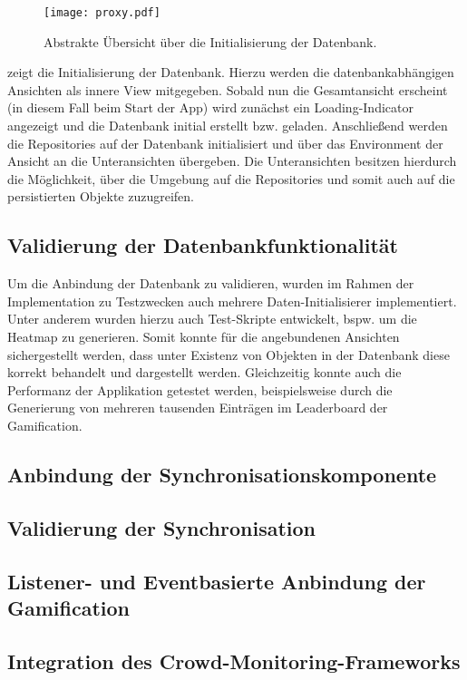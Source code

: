 \begin{figure}[H]
\texttt{[image: proxy.pdf]}
\caption{Abstrakte Übersicht über die Initialisierung der Datenbank.}\label{fig:proxy}
\end{figure}

 zeigt die Initialisierung der Datenbank. Hierzu werden die datenbankabhängigen Ansichten als innere View mitgegeben. Sobald nun die Gesamtansicht erscheint (in diesem Fall beim Start der App) wird zunächst ein Loading-Indicator angezeigt und die Datenbank initial erstellt bzw. geladen. Anschließend werden die Repositories auf der Datenbank initialisiert und über das Environment der Ansicht an die Unteransichten übergeben. Die Unteransichten besitzen hierdurch die Möglichkeit, über die Umgebung auf die Repositories und somit auch auf die persistierten Objekte zuzugreifen.

\subsection{Validierung der Datenbankfunktionalität}

Um die Anbindung der Datenbank zu validieren, wurden im Rahmen der Implementation zu Testzwecken auch mehrere Daten-Initialisierer implementiert. Unter anderem wurden hierzu auch Test-Skripte entwickelt, bspw. um die Heatmap zu generieren. Somit konnte für die angebundenen Ansichten sichergestellt werden, dass unter Existenz von Objekten in der Datenbank diese korrekt behandelt und dargestellt werden. Gleichzeitig konnte auch die Performanz der Applikation getestet werden, beispielsweise durch die Generierung von mehreren tausenden Einträgen im Leaderboard der Gamification.

\subsection{Anbindung der Synchronisationskomponente}



\subsection{Validierung der Synchronisation}

\subsection{Listener- und Eventbasierte Anbindung der Gamification}

\subsection{Integration des Crowd-Monitoring-Frameworks}
